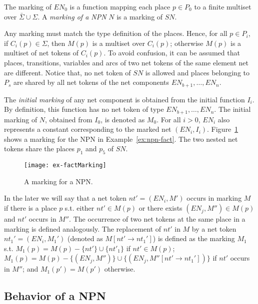 \documentclass{llncs}
\begin{document}
The marking of $EN_0$  is a function mapping each place $p\in P_0$ to a finite multiset over $\bar{\Sigma}\cup\Sigma$. A \emph{marking of a NPN} $N$ is a marking of $SN$.

Any marking must match the type definition of the places. Hence, for all $p\in P_i$, if $C_i(p)\in\Sigma$, then $M(p)$ is a multiset over $C_i(p)$; otherwise $M(p)$ is a multiset of net tokens of $C_i(p)$.  To avoid confusion, it can be assumed that places, transitions, variables and arcs of two net tokens of the same element net are different. Notice that, no net token of $SN$ is allowed and places belonging to $P_s$ are shared by all net tokens of the net components $EN_{b+1},\ldots, EN_n$.

The \emph{initial marking} of any net component is obtained from the initial function $I_i$. By definition, this function has no net token of type $EN_{b+1},\ldots, EN_n$. The initial marking of $N$, obtained from $I_0$, is denoted as $M_0$. For all $i>0$, $EN_i$ also represents a constant corresponding to the marked net $(EN_i,I_i)$. Figure~\ref{figRPNFactMarking} shows a marking for the NPN in Example~\ref{ex:npn-fact}. The two nested net tokens share the places $p_1$ and $p_5$ of $SN$.


\begin{figure}
\begin{center}
\texttt{[image: ex-factMarking]}
\end{center}
\vspace{-10pt}
\caption{A marking for a NPN.}
\label{figRPNFactMarking}
\end{figure}



In the later we will say that a net token $nt'=(EN_i,M')$ occurs in marking $M$ if there is a place $p$ s.t. either $nt'\in M(p)$  or there exists $(EN_j,M'')\in M(p)$ and $nt'$ occurs in $M''$. The occurrence of two net tokens at the same place in a marking is defined analogously. The replacement of $nt'$ in $M$ by a net token $nt_1'=(EN_i,M_1')$ (denoted as $M[nt'\to nt_1']$) is defined as the marking $M_1$ s.t. $M_1(p)=M(p)-\{nt'\}\cup \{nt'_1\}$ if $nt'\in M(p)$; $M_1(p) = M(p)-\{(EN_j,M'')\}\cup \{(EN_j,M''[nt'\to nt_1'])\}$ if $nt'$ occurs in $M''$; and $M_1(p') = M(p')$ otherwise.

\subsection{Behavior of a NPN}
\end{document}
